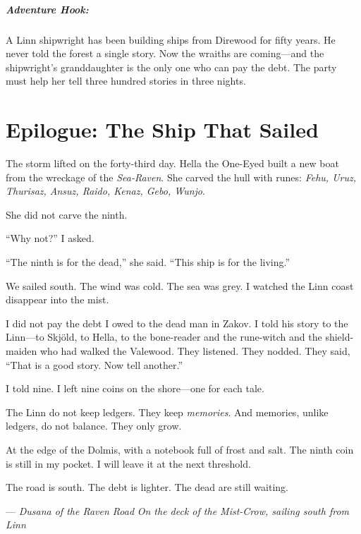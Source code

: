 \documentclass[9pt,a5paper]{extbook}
\begin{document}
\paragraph{Adventure Hook:}
A Linn shipwright has been building ships from Direwood for fifty years. He never told the forest a single story. Now the wraiths are coming---and the shipwright's granddaughter is the only one who can pay the debt. The party must help her tell three hundred stories in three nights.

\clearpage

\chapter*{Epilogue: The Ship That Sailed}

The storm lifted on the forty-third day. Hella the One-Eyed built a new boat from the wreckage of the \textit{Sea-Raven}. She carved the hull with runes: \textit{Fehu, Uruz, Thurisaz, Ansuz, Raido, Kenaz, Gebo, Wunjo}.

She did not carve the ninth.

``Why not?'' I asked.

``The ninth is for the dead,'' she said. ``This ship is for the living.''

We sailed south. The wind was cold. The sea was grey. I watched the Linn coast disappear into the mist.

I did not pay the debt I owed to the dead man in Zakov. I told his story to the Linn---to Skjöld, to Hella, to the bone-reader and the rune-witch and the shield-maiden who had walked the Valewood. They listened. They nodded. They said, ``That is a good story. Now tell another.''

I told nine. I left nine coins on the shore---one for each tale.

The Linn do not keep ledgers. They keep \textit{memories}. And memories, unlike ledgers, do not balance. They only grow.

At the edge of the Dolmis, with a notebook full of frost and salt. The ninth coin is still in my pocket. I will leave it at the next threshold.

The road is south. The debt is lighter. The dead are still waiting.

\hfill --- \textit{Dusana of the Raven Road}
\vspace{0.5cm}
\hfill \textit{On the deck of the \textit{Mist-Crow}, sailing south from Linn}

\clearpage
\end{document}
